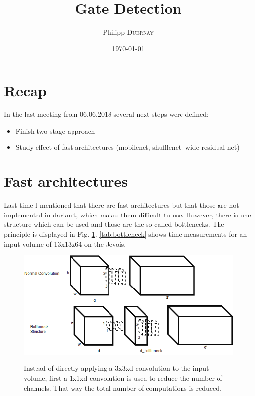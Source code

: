\documentclass{article}
\title{Gate Detection} %
\author{Philipp \textsc{Duernay}} %
\date{\today} %
\begin{document}
\maketitle


\section{Recap}
In the last meeting from 06.06.2018 several next steps were defined:
\begin{itemize}
	\item Finish two stage approach
	\item Study effect of fast architectures (mobilenet, shufflenet, wide-residual net)
\end{itemize}


\section{Fast architectures}

Last time I mentioned that there are fast architectures but that those are not implemented in darknet, which makes them difficult to use. However, there is one structure which can be used and those are the so called bottlenecks. The principle is displayed in Fig. \ref{fig:bottleneck}. \autoref{tab:bottleneck} shows time measurements for an input volume of 13x13x64 on the Jevois.

\begin{figure}[htbp]
		\centering
	\includegraphics[width=0.5\linewidth]{bottleneck}
	\label{fig:bottleneck}
	\caption{Instead of directly applying a 3x3xd convolution to the input volume, first a 1x1xd convolution is used to reduce the number of channels. That way the total number of computations is reduced. }
\end{figure}
\end{document}
